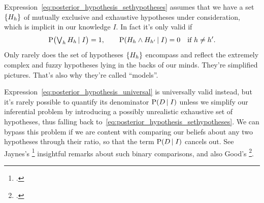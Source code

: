\documentclass[\ifafour a4paper,12pt,\else a5paper,10pt,\fi%
onecolumn,oneside,article,%
british%
]{memoir}
\theoremstyle{remark}
\theoremstyle{innote}
\newcommand*{\citep}{\footcites}
\newcommand*{\citey}{\footcites}%
\DeclarePairedDelimiter\set{\{}{\}}
\newcommand*{\p}{\mathrm{P}}%
\renewcommand*{\|}[1][]{\nonscript\,#1\vert\nonscript\;\mathopen{}}
\newcommand*{\sect}{\S}%
\newcommand*{\sects}{\S\S}%
\newcommand*{\tlor}{\mathop{\textstyle\bigvee}\nolimits}
\newcommand*{\yK}{I}
\begin{document}


Expression~\eqref{eq:posterior_hypothesis_sethypotheses} assumes that we
have a set $\set{H_{h}}$ of mutually exclusive and exhaustive hypotheses
under consideration, which is implicit in our knowledge $\yK$. In fact it's
only valid if
\begin{equation}
  \label{eq:implicit_knowledge}
  \p\bigl(\tlor_{h} H_{h} \| \yK\bigr) = 1,
  \qquad
  \p(H_{h} \land H_{h'} \| \yK) = 0 \quad \text{if $h \ne h'$}.
\end{equation}\pagebreak
Only  rarely does the set of hypotheses $\set{H_{h}}$
encompass and reflect the extremely complex and fuzzy hypotheses lying in
the backs of our minds. They're simplified pictures. That's also why
they're %
called \enquote{models}.

Expression~\eqref{eq:posterior_hypothesis_universal} is universally valid
instead, but it's rarely possible to quantify its denominator
$\p(D \| \yK)$ unless we simplify our inferential problem by introducing a
possibly unrealistic exhaustive set of hypotheses, thus falling back
to~\eqref{eq:posterior_hypothesis_sethypotheses}. We can bypass this
problem if we are content with comparing our beliefs about any two
hypotheses through their ratio, so that the term $\p(D \| \yK)$ cancels
out. See Jaynes's \citey[\sects~4.3--4.4]{jaynes1994_r2003} insightful
remarks about such binary comparisons, and also Good's
\citey[\sect~6.3--6.6]{good1950}.
\end{document}
